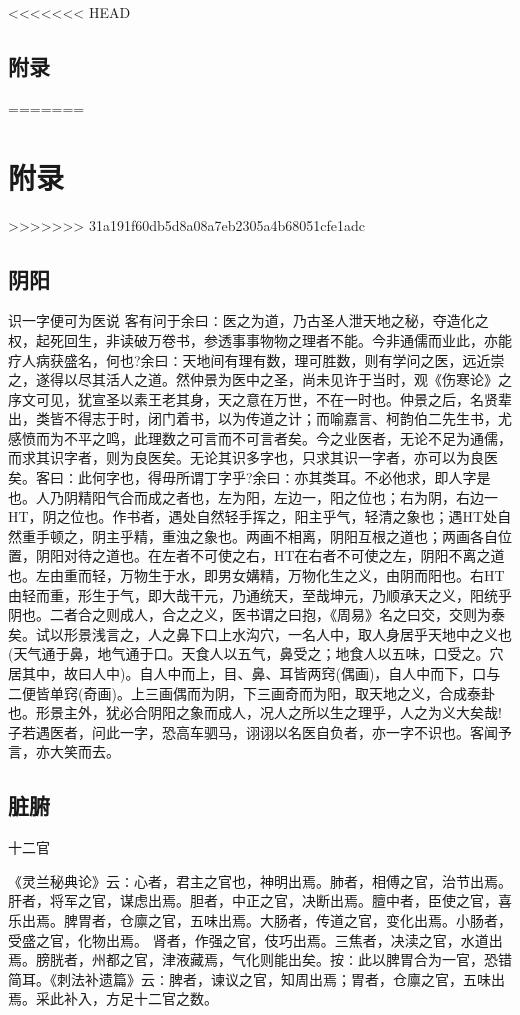 \documentclass[a4paper,12pt,UTF8,twoside]{ctexbook}
\begin{document}
<<<<<<< HEAD
	\chapter{附录}
=======
	\part{附录}
>>>>>>> 31a191f60db5d8a08a7eb2305a4b68051cfe1adc
	\chapter{阴阳}
    识一字便可为医说	
	客有问于余曰∶医之为道，乃古圣人泄天地之秘，夺造化之权，起死回生，非读破万卷书，参透事事物物之理者不能。今非通儒而业此，亦能疗人病获盛名，何也?余曰∶天地间有理有数，理可胜数，则有学问之医，远近崇之，遂得以尽其活人之道。然仲景为医中之圣，尚未见许于当时，观《伤寒论》之序文可见，犹宣圣以素王老其身，天之意在万世，不在一时也。仲景之后，名贤辈出，类皆不得志于时，闭门着书，以为传道之计；而喻嘉言、柯韵伯二先生书，尤感愤而为不平之鸣，此理数之可言而不可言者矣。今之业医者，无论不足为通儒，而求其识字者，则为良医矣。无论其识多字也，只求其识一字者，亦可以为良医矣。客曰∶此何字也，得毋所谓丁字乎?余曰∶亦其类耳。不必他求，即人字是也。人乃阴精阳气合而成之者也，左为阳，左边一，阳之位也；右为阴，右边一HT，阴之位也。作书者，遇处自然轻手挥之，阳主乎气，轻清之象也；遇HT处自然重手顿之，阴主乎精，重浊之象也。两画不相离，阴阳互根之道也；两画各自位置，阴阳对待之道也。在左者不可使之右，HT在右者不可使之左，阴阳不离之道也。左由重而轻，万物生于水，即男女媾精，万物化生之义，由阴而阳也。右HT由轻而重，形生于气，即大哉干元，乃通统天，至哉坤元，乃顺承天之义，阳统乎阴也。二者合之则成人，合之之义，医书谓之曰抱，《周易》名之曰交，交则为泰矣。试以形景浅言之，人之鼻下口上水沟穴，一名人中，取人身居乎天地中之义也(天气通于鼻，地气通于口。天食人以五气，鼻受之；地食人以五味，口受之。穴居其中，故曰人中)。自人中而上，目、鼻、耳皆两窍(偶画)，自人中而下，口与二便皆单窍(奇画)。上三画偶而为阴，下三画奇而为阳，取天地之义，合成泰卦也。形景主外，犹必合阴阳之象而成人，况人之所以生之理乎，人之为义大矣哉!子若遇医者，问此一字，恐高车驷马，诩诩以名医自负者，亦一字不识也。客闻予言，亦大笑而去。

	\chapter{脏腑}
	十二官
  
	《灵兰秘典论》云∶心者，君主之官也，神明出焉。肺者，相傅之官，治节出焉。肝者，将军之官，谋虑出焉。胆者，中正之官，决断出焉。膻中者，臣使之官，喜乐出焉。脾胃者，仓廪之官，五味出焉。大肠者，传道之官，变化出焉。小肠者，受盛之官，化物出焉。
	肾者，作强之官，伎巧出焉。三焦者，决渎之官，水道出焉。膀胱者，州都之官，津液藏焉，气化则能出矣。按∶此以脾胃合为一官，恐错简耳。《刺法补遗篇》云∶脾者，谏议之官，知周出焉；胃者，仓廪之官，五味出焉。采此补入，方足十二官之数。
		
\end{document}
